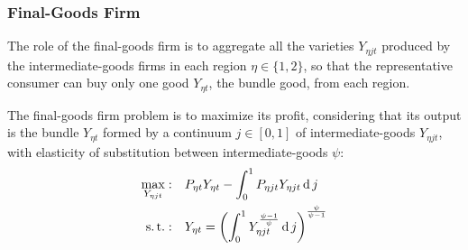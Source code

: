 \documentclass[../thesis.tex]{subfiles}
\begin{document}

\subsubsection{Final-Goods Firm}


The role of the final-goods firm is to aggregate all the varieties $Y_{\eta jt}$ produced by the intermediate-goods firms in each region $\eta \in \{1,2\}$, so that the representative consumer can buy only one good $Y_{\eta t}$, the bundle good, from each region.



The final-goods firm problem is to maximize its profit, considering that its output is the bundle $Y_{\eta t}$ formed by a continuum $j \in [0,1]$ of intermediate-goods $Y_{\eta jt}$, with elasticity of substitution between intermediate-goods $\psi$:
\begin{align}
	\max_{Y_{\eta jt}}: &\quad P_{\eta t} Y_{\eta t} - \int_{0}^{1} P_{\eta jt} Y_{\eta jt} \operatorname{d} j \label{eq_v2:reg-final-goods-firm-max-problem} \\
	\operatorname{s.t.}: & \quad Y_{\eta t} = \left( \int_{0}^{1} Y_{\eta jt}^{\frac{\psi-1}{\psi}} \operatorname{d} j \right)^{\frac{\psi}{\psi-1}} \label{eq_v2:reg-final-goods-firm-bundle-rule}
\end{align}

\begin{comment}

Substitute \ref{eq_v2:reg-final-goods-firm-bundle-rule} in \ref{eq_v2:reg-final-goods-firm-max-problem}:
\begin{align}
	\label{eq_v2:reg-final-goods-firm-max-problem-2}
	\max_{Y_{\eta jt}}: & \quad \Pi_{\eta t} = P_{\eta t} \left( \int_{0}^{1} Y_{\eta jt}^{\frac{\psi-1}{\psi}} \dif j \right)^{\frac{\psi}{\psi-1}} - \int_{0}^{1} P_{\eta jt} Y_{\eta jt} \dif j
\end{align}

\end{comment}
\end{document}
